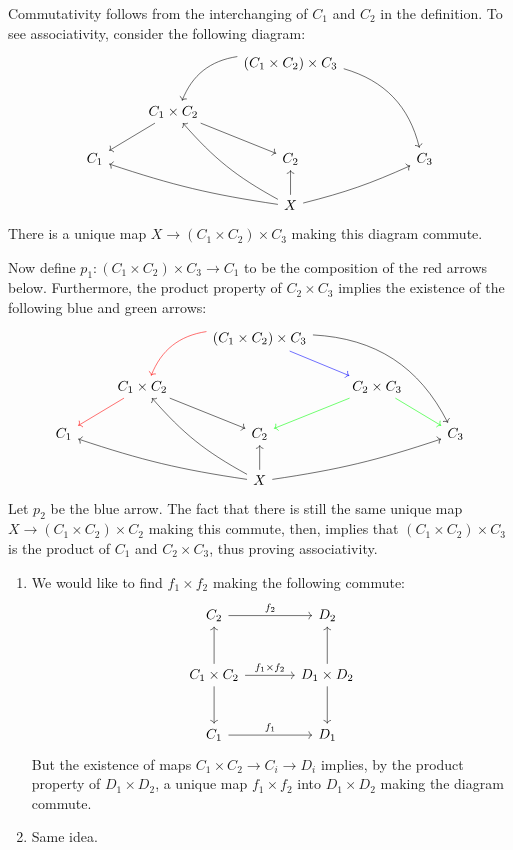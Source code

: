 \documentclass[../../solutions.tex]{subfiles}
\begin{document}
\begin{exercise} \leavevmode
Commutativity follows from the interchanging of $C_1$ and $C_2$ in the definition.
To see associativity, consider the following diagram:
\[
\begin{tikzcd}
& & (C_1\times C_2)\times C_3\ar[dl,bend right]\ar[ddrr,bend left] & & \\
& C_1\times C_2\ar[dl]\ar[dr] & & & \\
C_1 & & C_2 & & C_3 \\
& & X\ar[ull,bend left=5]\ar[u]\ar[urr,bend right=5]\ar[uul,bend left=10] & &
\end{tikzcd}
\]
There is a unique map $X\to(C_1\times C_2)\times C_3$ making this diagram commute.

Now define $p_1:(C_1\times C_2)\times C_3\to C_1$ to be the composition of the red arrows below.
Furthermore, the product property of $C_2\times C_3$ implies the existence of the following blue and green arrows:
\[
\begin{tikzcd}
& & (C_1\times C_2)\times C_3\ar[dl,bend right,red]\ar[ddrr,bend left]\ar[dr,blue] & & \\
& C_1\times C_2\ar[dl,red]\ar[dr] & & C_2\times C_3\ar[dr,green]\ar[dl,green] & \\
C_1 & & C_2 & & C_3 \\
& & X\ar[ull,bend left=5]\ar[u]\ar[urr,bend right=5]\ar[uul,bend left=10] & &
\end{tikzcd}
\]
Let $p_2$ be the blue arrow.
The fact that there is still the same unique map $X\to(C_1\times C_2)\times C_2$ making this commute, then, implies that $(C_1\times C_2)\times C_3$ is the product of $C_1$ and $C_2\times C_3$, thus proving associativity.
\end{exercise}

\begin{exercise} \leavevmode
\begin{enumerate}
\item
We would like to find $f_1\times f_2$ making the following commute:
\[
\begin{tikzcd}[column sep=large,row sep=large]
C_2\ar[r,"f_2"]\ar[d,leftarrow] & D_2\ar[d,leftarrow] \\
C_1\times C_2\ar[r,"f_1\times f_2"]\ar[d] & D_1\times D_2\ar[d]\\
C_1\ar[r,"f_1"] & D_1
\end{tikzcd}
\]
But the existence of maps $C_1\times C_2\to C_i\to D_i$ implies, by the product property of $D_1\times D_2$, a unique map $f_1\times f_2$ into $D_1\times D_2$ making the diagram commute.

\item
Same idea.
\end{enumerate}
\end{exercise}
\end{document}
